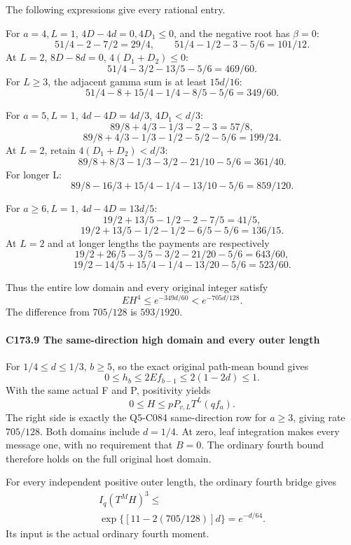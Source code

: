 The following expressions give every rational entry.

For \(a=4,\allowbreak \allowbreak  L=1\), \(4D-4d=0,\allowbreak \allowbreak  4D_1\le0\), and the negative root has \(\beta=0\):
\[
51/4-2-7/2=29/4,\qquad
51/4-1/2-3-5/6=101/12.
\]
At \(L=2\), \(8D-8d=0\), \(4(D_1+D_2)\le0\):
\[
51/4-3/2-13/5-5/6=469/60.
\]
For \(L\ge3\), the adjacent gamma sum is at least \(15d/16\):
\[
51/4-8+15/4-1/4-8/5-5/6=349/60.
\]

For \(a=5,\allowbreak \allowbreak  L=1\), \(4d-4D=4d/3\), \(4D_1<d/3\):
\[
89/8+4/3-1/3-2-3=57/8,
\]
\[
89/8+4/3-1/3-1/2-5/2-5/6=199/24.
\]
At \(L=2\), retain \(4(D_1+D_2)<d/3\):
\[
89/8+8/3-1/3-3/2-21/10-5/6=361/40.
\]
For longer L:
\[
89/8-16/3+15/4-1/4-13/10-5/6=859/120.
\]

For \(a\ge6,\allowbreak \allowbreak  L=1\), \(4d-4D=13d/5\):
\[
19/2+13/5-1/2-2-7/5=41/5,
\]
\[
19/2+13/5-1/2-1/2-6/5-5/6=136/15.
\]
At \(L=2\) and at longer lengths the payments are respectively
\[
19/2+26/5-3/5-3/2-21/20-5/6=643/60,
\]
\[
19/2-14/5+15/4-1/4-13/20-5/6=523/60.
\]

Thus the entire low domain and every original integer satisfy
\[
\boxed{EH^4\le e^{-349d/60}<e^{-705d/128}.}          \tag{C173.T183.33}
\]
The difference from \(705/128\) is \(593/1920\).

\paragraph{C173.9 The same-direction high domain and every outer length}

For \(1/4\le d\le1/3\), \(b\ge5\), so the exact original path-mean bound gives
\[
0\le h_b\le2Ef_{b-1}\le2(1-2d)\le1.
\]
With the same actual F and P, positivity yields
\[
0\le H\le pP_{v,L}T^L(qf_a).
\]
The right side is exactly the Q5-C084 same-direction row for \(a\ge3\), giving rate \(705/128\). Both domains include \(d=1/4\). At zero, leaf integration makes every message one, with no requirement that \(B=0\). The ordinary fourth bound therefore holds on the full original host domain.

For every independent positive outer length, the ordinary fourth bridge gives
\[
\begin{gathered}
I_q(T^MH)^3\le\\
\exp\{[11-2(705/128)]d\}=e^{-d/64}.
\end{gathered}\tag{C173.T183.34}
\]
Its input is the actual ordinary fourth moment.
